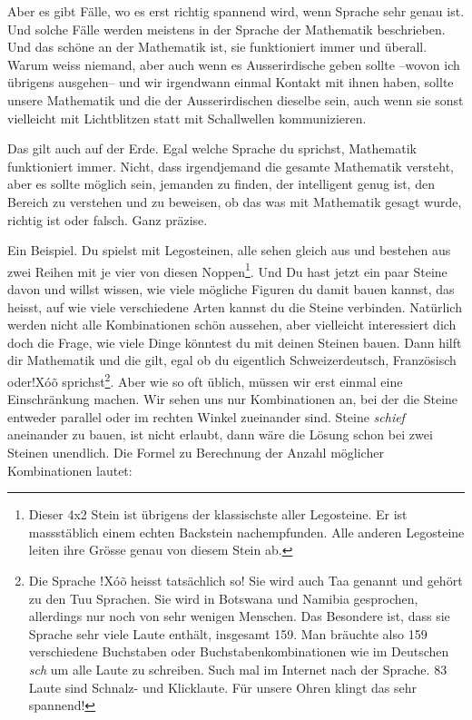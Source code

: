 Aber es gibt Fälle, wo es erst richtig spannend wird, wenn Sprache sehr genau ist. Und solche Fälle werden meistens in der Sprache der Mathematik beschrieben. Und das schöne an der Mathematik ist, sie funktioniert immer und überall. Warum weiss niemand, aber auch wenn es Ausserirdische geben sollte --wovon ich übrigens ausgehen-- und wir irgendwann einmal Kontakt mit ihnen haben, sollte unsere Mathematik und die der Ausserirdischen dieselbe sein, auch wenn sie sonst vielleicht mit Lichtblitzen statt mit Schallwellen kommunizieren.

Das gilt auch auf der Erde. Egal welche Sprache du sprichst, Mathematik funktioniert immer. Nicht, dass irgendjemand die gesamte Mathematik versteht, aber es sollte möglich sein, jemanden zu finden, der intelligent genug ist, den Bereich zu verstehen und zu beweisen, ob das was mit Mathematik gesagt wurde, richtig ist oder falsch. Ganz präzise.

Ein Beispiel. Du spielst mit Legosteinen, alle sehen gleich aus und bestehen aus zwei Reihen mit je vier von diesen Noppen\footnote{Dieser 4x2 Stein ist übrigens der klassischste aller Legosteine. Er ist massstäblich einem echten Backstein nachempfunden. Alle anderen Legosteine leiten ihre Grösse genau von diesem Stein ab.}. Und Du hast jetzt ein paar Steine davon und willst wissen, wie viele mögliche Figuren du damit bauen kannst, das heisst, auf wie viele verschiedene Arten kannst du die Steine verbinden. Natürlich werden nicht alle Kombinationen schön aussehen, aber vielleicht interessiert dich doch die Frage, wie viele Dinge könntest du mit deinen Steinen bauen. Dann hilft dir Mathematik und die gilt, egal ob du eigentlich Schweizerdeutsch, Französisch oder$!$X\'{o}\~{o} sprichst\footnote{Die Sprache $ǃ$X\'{o}\~{o} heisst tatsächlich so! Sie wird auch Taa genannt und gehört zu den Tuu Sprachen. Sie wird in Botswana und Namibia gesprochen, allerdings nur noch von sehr wenigen Menschen. Das Besondere ist, dass sie Sprache sehr viele Laute enthält, insgesamt 159. Man bräuchte also 159 verschiedene Buchstaben oder Buchstabenkombinationen wie im Deutschen \textit{sch} um alle Laute zu schreiben. Such mal im Internet nach der Sprache. 83 Laute sind Schnalz- und Klicklaute. Für unsere Ohren klingt das sehr spannend!}. Aber wie so oft üblich, müssen wir erst einmal eine Einschränkung machen. Wir sehen uns nur Kombinationen an, bei der die Steine entweder parallel oder im rechten Winkel zueinander sind. Steine \textit{schief} aneinander zu bauen, ist nicht erlaubt, dann wäre die Lösung schon bei zwei Steinen unendlich. Die Formel zu Berechnung der Anzahl möglicher Kombinationen lautet:

